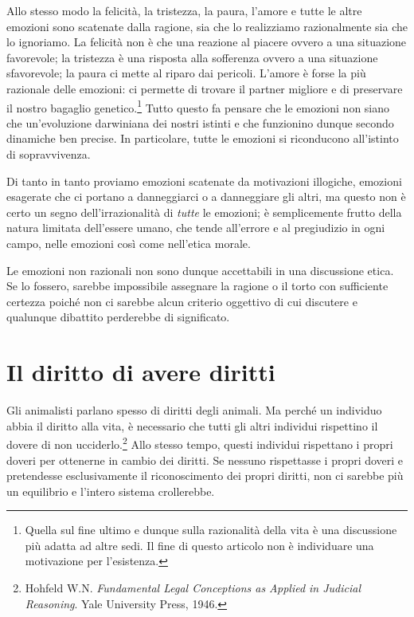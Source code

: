 \documentclass[a4paper,11pt,oneside,article]{memoir}
\begin{document}
Allo stesso modo la felicità, la tristezza, la paura, l'amore e tutte le altre
emozioni sono scatenate dalla ragione, sia che lo realizziamo razionalmente sia
che lo ignoriamo. La felicità non è che una reazione al piacere ovvero a una
situazione favorevole; la tristezza è una risposta alla sofferenza ovvero a una
situazione sfavorevole; la paura ci mette al riparo dai pericoli. L'amore è
forse la più razionale delle emozioni: ci permette di trovare il partner
migliore e di preservare il nostro bagaglio genetico.\footnote{Quella sul fine
ultimo e dunque sulla razionalità della vita è una discussione più adatta ad
altre sedi. Il fine di questo articolo non è individuare una motivazione per
l'esistenza.} Tutto questo fa pensare che le emozioni non siano che
un'evoluzione darwiniana dei nostri istinti e che funzionino dunque secondo
dinamiche ben precise. In particolare, tutte le emozioni si riconducono
all'istinto di sopravvivenza.

Di tanto in tanto proviamo emozioni scatenate da motivazioni illogiche, emozioni
esagerate che ci portano a danneggiarci o a danneggiare gli altri, ma questo non
è certo un segno dell'irrazionalità di \emph{tutte} le emozioni; è semplicemente
frutto della natura limitata dell'essere umano, che tende all'errore e al
pregiudizio in ogni campo, nelle emozioni così come nell'etica morale.

Le emozioni non razionali non sono dunque accettabili in una discussione etica.
Se lo fossero, sarebbe impossibile assegnare la ragione o il torto con
sufficiente certezza poiché non ci sarebbe alcun criterio oggettivo di cui
discutere e qualunque dibattito perderebbe di significato.

\chapter{Il diritto di avere diritti}

Gli animalisti parlano spesso di diritti degli animali. Ma perché un individuo
abbia il diritto alla vita, è necessario che tutti gli altri individui
rispettino il dovere di non ucciderlo.\footnote{Hohfeld W.N. \emph{Fundamental
Legal Conceptions as Applied in Judicial Reasoning}. Yale University Press,
1946.} Allo stesso tempo, questi individui rispettano i propri doveri per
ottenerne in cambio dei diritti. Se nessuno rispettasse i propri doveri e
pretendesse esclusivamente il riconoscimento dei propri diritti, non ci sarebbe
più un equilibrio e l'intero sistema crollerebbe.
\end{document}
